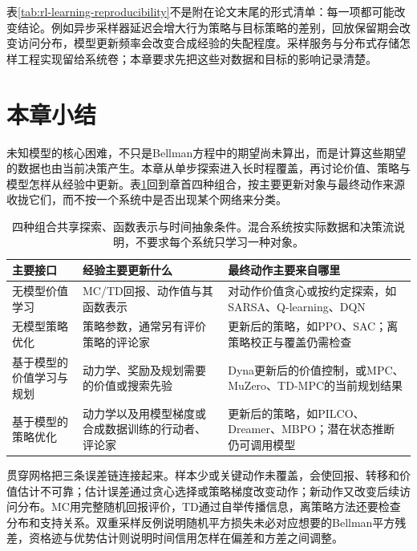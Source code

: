 表\ref{tab:rl-learning-reproducibility}不是附在论文末尾的形式清单：每一项都可能改变结论。例如异步采样器延迟会增大行为策略与目标策略的差别，回放保留期会改变访问分布，模型更新频率会改变合成经验的失配程度。采样服务与分布式存储怎样工程实现留给系统卷；本章要求先把这些对数据和目标的影响记录清楚。

\section{本章小结}
\label{sec:rl-learning-summary}

未知模型的核心困难，不只是Bellman方程中的期望尚未算出，而是计算这些期望的数据也由当前决策产生。本章从单步探索进入长时程覆盖，再讨论价值、策略与模型怎样从经验中更新。表\ref{tab:rl-learning-final-interfaces}回到章首四种组合，按主要更新对象与最终动作来源收拢它们，而不按一个系统中是否出现某个网络来分类。

\begin{table}[t]
  \centering
  \small
  \begin{tabularx}{\linewidth}{>{\raggedright\arraybackslash}p{28mm} >{\raggedright\arraybackslash}X >{\raggedright\arraybackslash}X}
    \toprule
    主要接口 & 经验主要更新什么 & 最终动作主要来自哪里 \\
    \midrule
    无模型价值学习 & MC/TD回报、动作值与其函数表示 & 对动作价值贪心或按约定探索，如SARSA、Q-learning、DQN \\
    无模型策略优化 & 策略参数，通常另有评价策略的评论家 & 更新后的策略，如PPO、SAC；离策略校正与覆盖仍需检查 \\
    基于模型的价值学习与规划 & 动力学、奖励及规划需要的价值或搜索先验 & Dyna更新后的价值控制，或MPC、MuZero、TD-MPC的当前规划结果 \\
    基于模型的策略优化 & 动力学以及用模型梯度或合成数据训练的行动者、评论家 & 更新后的策略，如PILCO、Dreamer、MBPO；潜在状态推断仍可调用模型 \\
    \bottomrule
  \end{tabularx}
  \caption{四种组合共享探索、函数表示与时间抽象条件。混合系统按实际数据和决策流说明，不要求每个系统只学习一种对象。}
  \label{tab:rl-learning-final-interfaces}
\end{table}

贯穿网格把三条误差链连接起来。样本少或关键动作未覆盖，会使回报、转移和价值估计不可靠；估计误差通过贪心选择或策略梯度改变动作；新动作又改变后续访问分布。MC用完整随机回报评价，TD通过自举传播信息，离策略方法还要检查分布和支持关系。双重采样反例说明随机平方损失未必对应想要的Bellman平方残差，资格迹与优势估计则说明时间信用怎样在偏差和方差之间调整。

